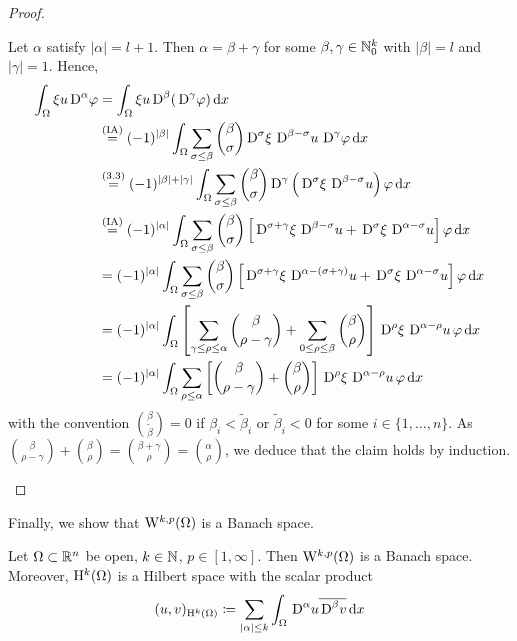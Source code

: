 \begin{proof}
\begin{enumerate}
      Let $\alpha$ satisfy $|\alpha| = l+1$.
      Then $\alpha  = \beta + \gamma$ for some $\beta, \gamma \in \mathbb{N}_0^k$ with $|\beta| = l$ and $|\gamma| = 1$.
      Hence,
      \begin{align*}
        \int_\Omega \xi u \,{\operatorname{D}}^\alpha \varphi
        &= \int_\Omega \xi u\,{\operatorname{D}}^\beta (\,{\operatorname{D}}^\gamma \varphi ) \, {\operatorname{d}\!{x}} \\
        &\overset{\mathrm{(IA)}}{=} (-1)^{|\beta|} \int_\Omega \sum_{\sigma \leq \beta} \binom{\beta}{\sigma} \,{\operatorname{D}}^\sigma \xi\, \,{\operatorname{D}}^{\beta - \sigma} u\, \,{\operatorname{D}}^\gamma \varphi \, {\operatorname{d}\!{x}} \\
        &\overset{(3.3)}{=} (-1)^{|\beta|+|\gamma|} \int_\Omega \sum_{\sigma \leq \beta} \binom{\beta}{\sigma} \,{\operatorname{D}}^\gamma \left( \,{\operatorname{D}}^\sigma \xi \, \,{\operatorname{D}}^{\beta - \sigma} u \right) \varphi \, {\operatorname{d}\!{x}} \\
        &\overset{\mathrm{(IA)}}{=} (-1)^{|\alpha|} \int_\Omega \sum_{\sigma \leq \beta} \binom{\beta}{\sigma} \left[ \,{\operatorname{D}}^{\sigma + \gamma} \xi\, \,{\operatorname{D}}^{\beta - \sigma} u + \,{\operatorname{D}}^\sigma \xi \,\,{\operatorname{D}}^{\alpha - \sigma} u \right] \varphi \, {\operatorname{d}\!{x}}\\
        &= (-1)^{|\alpha|} \int_\Omega \sum_{\sigma \leq \beta} \binom{\beta}{\sigma} \left[ \,{\operatorname{D}}^{\sigma + \gamma} \xi\, \,{\operatorname{D}}^{\alpha - (\sigma + \gamma)} u + \,{\operatorname{D}}^\sigma \xi \,\,{\operatorname{D}}^{\alpha - \sigma} u \right] \varphi \, {\operatorname{d}\!{x}}\\
        &= (-1)^{|\alpha|} \int_\Omega \left [\sum_{\gamma \leq \rho \leq \alpha} \binom{\beta}{\rho - \gamma} + \sum_{0 \leq \rho \leq \beta} \binom{\beta}{\rho} \right] \,{\operatorname{D}}^\rho \xi \,\,{\operatorname{D}}^{\alpha - \rho}u \, \varphi \, {\operatorname{d}\!{x}} \\
        &= (-1)^{|\alpha|} \int_\Omega \sum_{\rho \leq \alpha} \left[ \binom{\beta}{\rho - \gamma} + \binom{\beta }{\rho}\right] \,{\operatorname{D}}^\rho \xi \, \,{\operatorname{D}}^{\alpha - \rho} u \, \varphi \, {\operatorname{d}\!{x}}
      \end{align*}
      with the convention $\binom{\beta}{\tilde\beta} = 0$ if $\beta_i < \tilde \beta_i$ or $\tilde \beta_i < 0$ for some $i \in \{1,\dots,n\}$.
      As $\binom{\beta}{\rho - \gamma} + \binom{\beta}{\rho} = \binom{\beta + \gamma}{\rho} = \binom{\alpha}{\rho}$, we deduce that the claim holds by induction.\qedhere
  \end{enumerate}
\end{proof}

Finally, we show that $\mathrm{W}^{k,p}(\Omega)$ is a Banach space.

\begin{thm}
  Let $\Omega \subset \mathbb{R}^n$ be open, $k \in \mathbb{N}$, $p \in [1,\infty]$.
  Then $\mathrm{W}^{k,p}(\Omega)$ is a Banach space.
  Moreover, $\mathrm{H}^k(\Omega)$ is a Hilbert space with the scalar product
  $$
  (u,v)_{\mathrm{H}^k(\Omega)} \coloneqq \sum_{|\alpha| \leq k} \int_\Omega \,{\operatorname{D}}^\alpha u \overline{\,{\operatorname{D}}^\beta v} \, {\operatorname{d}\!{x}}
  $$
\end{thm}

